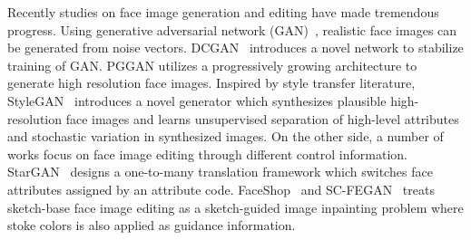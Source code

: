 Recently studies on face image generation and editing have made tremendous progress.
Using generative adversarial network (GAN)~\cite{GANs}, realistic face images can be generated from noise vectors.
%
DCGAN~\cite{DCGANs} introduces a novel network to stabilize training of GAN.
PGGAN\cite{PGGAN} utilizes a progressively growing architecture to generate high resolution face images.
Inspired by style transfer literature, StyleGAN~\cite{StyleGAN} introduces a novel generator which synthesizes plausible high-resolution face images and learns unsupervised separation of high-level attributes and stochastic variation in synthesized images. 
%
On the other side, a number of works focus on face image editing through different control information. StarGAN~\cite{StarGAN-CVPR2018} designs a one-to-many translation framework which switches face attributes assigned by an attribute code. FaceShop~\cite{Faceshop-Portenier-TOG18} and SC-FEGAN~\cite{SC-FEGAN-Jo-ICCV2019} treats sketch-base face image editing as a sketch-guided image inpainting problem where stoke colors is also applied as guidance information. 

